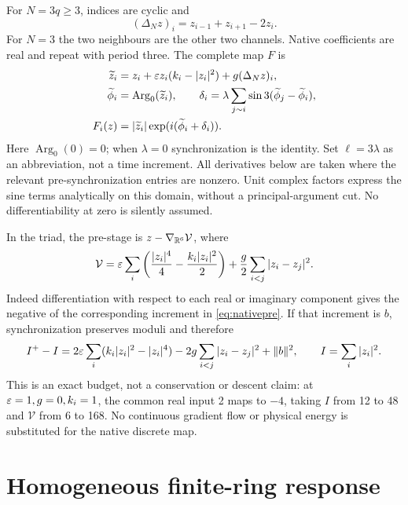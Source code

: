 For \(N=3q\ge3\), indices are cyclic and
\begin{equation}
(\Delta_Nz)_i=z_{i-1}+z_{i+1}-2z_i .
\end{equation}
For \(N=3\) the two neighbours are the other two channels. Native coefficients are real and repeat with period three. The complete map \(F\) is
\begin{align}
\widetilde z_i&=z_i+\varepsilon z_i(k_i-|z_i|^2)+g(\Delta_Nz)_i,\label{eq:nativepre}\\
\widetilde\phi_i&=\operatorname{Arg}_0(\widetilde z_i),\qquad
\delta_i=\lambda\sum_{j\sim i}\sin 3(\widetilde\phi_j-\widetilde\phi_i),\\
F_i(z)&=|\widetilde z_i|\exp(i(\widetilde\phi_i+\delta_i)).\label{eq:nativepost}
\end{align}
Here \(\operatorname{Arg}_0(0)=0\); when \(\lambda=0\) synchronization is the identity. Set \(\ell=3\lambda\) as an abbreviation, not a time increment. All derivatives below are taken where the relevant pre-synchronization entries are nonzero. Unit complex factors express the sine terms analytically on this domain, without a principal-argument cut. No differentiability at zero is silently assumed.

In the triad, the pre-stage is \(z-\nabla_{\mathbb R^6}\mathcal V\), where
\begin{equation}
\mathcal V=\varepsilon\sum_i\left(\frac{|z_i|^4}{4}-\frac{k_i|z_i|^2}{2}\right)
 +\frac g2\sum_{i<j}|z_i-z_j|^2.\label{eq:potential}
\end{equation}
Indeed differentiation with respect to each real or imaginary component gives the negative of the corresponding increment in \eqref{eq:nativepre}. If that increment is \(b\), synchronization preserves moduli and therefore
\begin{equation}
I^+-I=2\varepsilon\sum_i(k_i|z_i|^2-|z_i|^4)
 -2g\sum_{i<j}|z_i-z_j|^2+\|b\|^2,\qquad I=\sum_i|z_i|^2.
\end{equation}
This is an exact budget, not a conservation or descent claim: at \(\varepsilon=1,g=0,k_i=1\), the common real input 2 maps to \(-4\), taking \(I\) from 12 to 48 and \(\mathcal V\) from 6 to 168. No continuous gradient flow or physical energy is substituted for the native discrete map. 

\section{Homogeneous finite-ring response}\label{sec:homogeneous}

